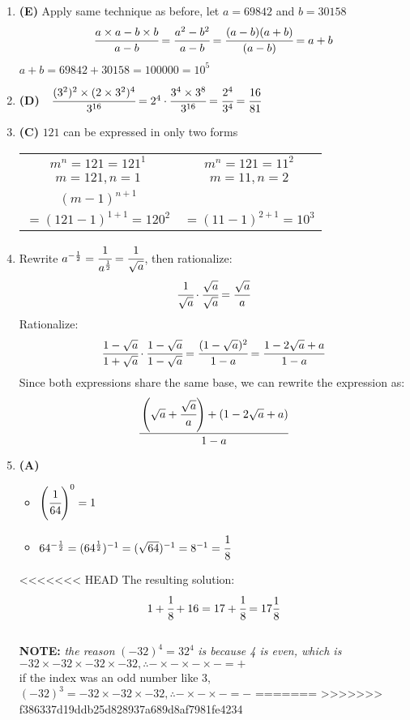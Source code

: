 \begin{multicols}{2}
\begin{enumerate}[label={\arabic*.}]
    \item \textbf{(E)} Apply same technique as before, let $a = 69842$ and $b = 30158$ \\
    $$\cfrac{a \times a - b \times b }{a - b} = \cfrac{a^2 - b^2}{a-b} = \cfrac{(a-b)(a+b)}{(a-b)} = a+b $$
    $ a + b = 69842 + 30158  = 100000 = 10^5$

    \item \textbf{(D)} \, \,$\cfrac{(3^2)^2 \times (2 \times 3^2)^4}{3^{16}} = 2^4 \cdot \cfrac{3^4 \times 3^8}{3^{16}} = \cfrac{2^4}{3^4} = \cfrac{16}{81}$

    \item \textbf{(C)} $121$ can be expressed in only two forms 
    \begin{tabular}{c|c}
        $m^n = 121 = 121^1$ & $m^n = 121 = 11^2$ \\
        $m = 121, n = 1$& $m = 11, n = 2$ \\
        $(m-1)^{n+1}$ & \\
            $= (121-1)^{1+1} = 120^2$ & $=(11 - 1)^{2+1} = 10^3$ \\    
    \end{tabular}

    \item Rewrite \( a^{-\frac{1}{2}} = \cfrac{1}{a^{\frac{1}{2}}} = \cfrac{1}{\sqrt{a}} \), then rationalize:
    \[\cfrac{1}{\sqrt{a}} \cdot \cfrac{\sqrt{a}}{\sqrt{a}} = \cfrac{\sqrt{a}}{a}\]
    Rationalize:
    \[\cfrac{1 - \sqrt{a}}{1 + \sqrt{a}} \cdot \cfrac{1 - \sqrt{a}}{1 - \sqrt{a}} = \cfrac{(1 - \sqrt{a})^2}{1 - a} = \cfrac{1 - 2\sqrt{a} + a}{1 - a}\]
    Since both expressions share the same base, we can rewrite the expression as:
    \[\cfrac{\left(\sqrt{a} + \cfrac{\sqrt{a}}{a}\right) + (1 - 2\sqrt{a} + a)}{1 - a}\]    

    \item \textbf{(A)}
    \begin{itemize} 
    \item $\left(\cfrac{1}{64}\right)^0 = 1$\\
    \item $64^{-\frac{1}{2}} = (64^{\frac{1}{2}})^{-1} = (\sqrt{64})^{-1}= 8^{-1} = \cfrac{1}{8}$ \\
    \end{itemize}
<<<<<<< HEAD
    The resulting solution: \\
    $$1 + \cfrac{1}{8} + 16 = 17 + \cfrac{1}{8} = 17\frac{1}{8}$$ \\
    \textbf{NOTE:} \textit{the reason} $(-32)^4 = 32^4$ \textit{ is because 4 is even, which is} $-32 \times -32 \times -32 \times -32, \therefore - \times - \times - \times - = +$  \\
    if the index was an odd number like 3, $(-32)^3 = -32 \times -32 \times -32, \therefore - \times - \times - = -$ 
=======
>>>>>>> f386337d19ddb25d828937a689d8af7981fe4234


\end{enumerate}
\end{multicols}
